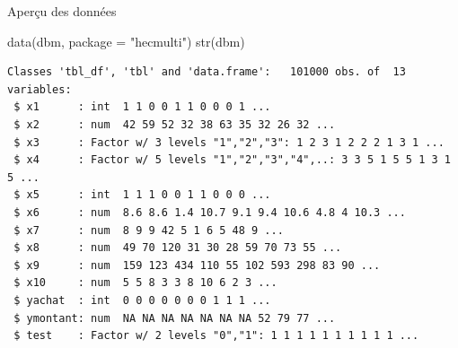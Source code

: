 \documentclass[
  ignorenonframetext,
]{beamer}
\newenvironment{Shaded}{\begin{snugshade}}{\end{snugshade}}
\newcommand{\AttributeTok}[1]{\textcolor[rgb]{0.40,0.45,0.13}{#1}}
\newcommand{\FunctionTok}[1]{\textcolor[rgb]{0.28,0.35,0.67}{#1}}
\newcommand{\NormalTok}[1]{\textcolor[rgb]{0.00,0.23,0.31}{#1}}
\newcommand{\StringTok}[1]{\textcolor[rgb]{0.13,0.47,0.30}{#1}}
\begin{document}
\begin{frame}[fragile]{Aperçu des données}
\protect\hypertarget{aperuxe7u-des-donnuxe9es}{}
\footnotesize

\begin{Shaded}
\begin{Highlighting}[numbers=left,,]
\FunctionTok{data}\NormalTok{(dbm, }\AttributeTok{package =} \StringTok{"hecmulti"}\NormalTok{)}
\FunctionTok{str}\NormalTok{(dbm)}
\end{Highlighting}
\end{Shaded}

\begin{verbatim}
Classes 'tbl_df', 'tbl' and 'data.frame':   101000 obs. of  13 variables:
 $ x1      : int  1 1 0 0 1 1 0 0 0 1 ...
 $ x2      : num  42 59 52 32 38 63 35 32 26 32 ...
 $ x3      : Factor w/ 3 levels "1","2","3": 1 2 3 1 2 2 2 1 3 1 ...
 $ x4      : Factor w/ 5 levels "1","2","3","4",..: 3 3 5 1 5 5 1 3 1 5 ...
 $ x5      : int  1 1 1 0 0 1 1 0 0 0 ...
 $ x6      : num  8.6 8.6 1.4 10.7 9.1 9.4 10.6 4.8 4 10.3 ...
 $ x7      : num  8 9 9 42 5 1 6 5 48 9 ...
 $ x8      : num  49 70 120 31 30 28 59 70 73 55 ...
 $ x9      : num  159 123 434 110 55 102 593 298 83 90 ...
 $ x10     : num  5 5 8 3 3 8 10 6 2 3 ...
 $ yachat  : int  0 0 0 0 0 0 0 1 1 1 ...
 $ ymontant: num  NA NA NA NA NA NA NA 52 79 77 ...
 $ test    : Factor w/ 2 levels "0","1": 1 1 1 1 1 1 1 1 1 1 ...
\end{verbatim}

\normalsize
\end{frame}
\end{document}
